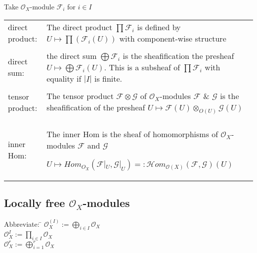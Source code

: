 \documentclass[a4paper, 12pt]{article}
\newcommand{\ca}[1]{\mathcal{#1}}
\newcommand{\caf}{\mathcal{F}}
\newcommand{\cag}{\mathcal{G}}
\newcommand{\oxmod}{$\mathcal{O}_X$-module }
\newcommand{\oxmods}{$\mathcal{O}_X$-modules }
\newcommand{\ox}{\mathcal{O}_X}
\begin{document}
Take \oxmod  $\ca{F}_i$ for $i \in I$
\\
\begin{longtable}{p{}  p{} } 


direct product: & The direct product $\prod \ca{F}_i$ is defined by $U\longmapsto \prod(\ca{F}_i(U))$ with component-wise structure
\\

&\\

direct sum: & the direct sum $\bigoplus \ca{F}_i$ is the sheafification the presheaf $U\longmapsto \bigoplus \ca{F}_i(U)$. This is a subsheaf of $\prod\ca{F}_i$ with equality if $|I|$ is finite.
\\

&\\

tensor product: &The tensor product $\ca{F}\otimes\ca{G}$ of \oxmods $\ca{F}$ \& $\cag$ is the sheafification of the presheaf $U\longmapsto \caf(U)\otimes_{O(U)}\cag(U)$
\\

&\\

inner Hom: & The inner Hom is the sheaf of homomorphisms of \oxmods $\caf$ and $\cag$

$U\longmapsto Hom_{O_X}(\caf|_U , \cag|_U) =: \ca{H}om_{\ca{O}(X)}(\caf , \cag)(U)$
\\

\end{longtable}


\subsection{Locally free \oxmods}

\begin{tabbing}
  Abbreviate:     \= $\ox^{(I)} := \bigoplus_{i \in I} \ox $\\
  \>$  \ox^I := \prod_{i \in I} \ox $\\
  \> $ \ox^r := \bigoplus^{r}_{i=1}\ox$
\end{tabbing}
\end{document}
